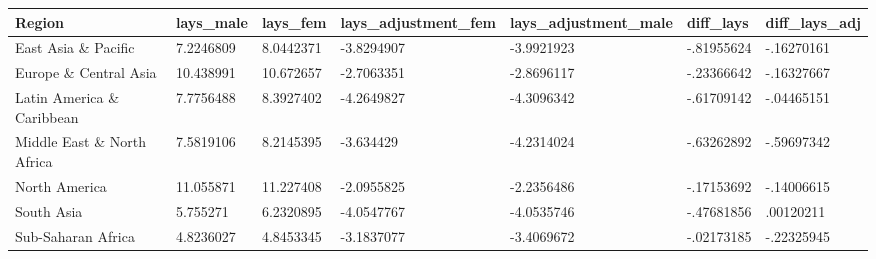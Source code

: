 \documentclass{article}
\begin{document}
\begin{table}[tbp] \centering
{}

\begin{tabularx}{\linewidth}{lCCCCCC}

\toprule
{Region}&{lays\_male}&{lays\_fem}&{lays\_adjustment\_fem}&{lays\_adjustment\_male}&{diff\_lays}&{diff\_lays\_adj} \tabularnewline
\midrule \addlinespace[\belowrulesep]
East Asia \& Pacific&7.2246809&8.0442371&-3.8294907&-3.9921923&-.81955624&-.16270161 \tabularnewline
Europe \& Central Asia&10.438991&10.672657&-2.7063351&-2.8696117&-.23366642&-.16327667 \tabularnewline
Latin America \& Caribbean&7.7756488&8.3927402&-4.2649827&-4.3096342&-.61709142&-.04465151 \tabularnewline
Middle East \& North Africa&7.5819106&8.2145395&-3.634429&-4.2314024&-.63262892&-.59697342 \tabularnewline
North America&11.055871&11.227408&-2.0955825&-2.2356486&-.17153692&-.14006615 \tabularnewline
South Asia&5.755271&6.2320895&-4.0547767&-4.0535746&-.47681856&.00120211 \tabularnewline
Sub-Saharan Africa&4.8236027&4.8453345&-3.1837077&-3.4069672&-.02173185&-.22325945 \tabularnewline
\bottomrule 

\end{tabularx}
\end{table}
\end{document}

